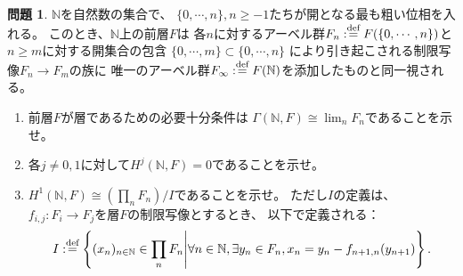 \documentclass[uplatex,dvipdfmx]{jsarticle}
\theoremstyle{definition}
\newtheorem{prob}[prob]{問題}
\newcommand\N{\mathbb{N}}
\def\dfn{:\overset{\mbox{{\scriptsize def}}}{=}}
\begin{document}
\begin{prob}\label{2.1}
  \(\N\)を自然数の集合で、
  \(\{0,\cdots, n\}, n\geq -1\)たちが開となる最も粗い位相を入れる。
  このとき、\(\N\)上の前層\(F\)は
  各\(n\)に対するアーベル群\(F_n\dfn F(\{0,\cdots,n\})\)と
  \(n\geq m\)に対する開集合の包含
  \(\{0,\cdots, m\} \subset \{0,\cdots ,n\}\)
  により引き起こされる制限写像\(F_n\to F_m\)の族に
  唯一のアーベル群\(F_{\infty}\dfn F(\N)\)を添加したものと同一視される。
  \begin{enumerate}[start=0]
    \item \label{2.1.0}
    前層\(F\)が層であるための必要十分条件は
    \(\Gamma(\N,F) \cong \lim_n F_n\)であることを示せ。
    \item \label{2.1.1}
    各\(j\neq 0,1\)に対して\(H^j(\N,F) = 0\)であることを示せ。
    \item \label{2.1.2}
    \(H^1(\N,F) \cong (\prod_n F_n)/I\)であることを示せ。
    ただし\(I\)の定義は、
    \(f_{i,j}:F_i\to F_j\)を層\(F\)の制限写像とするとき、
    以下で定義される：
    \[
    I\dfn \left\{ (x_n)_{n\in \N}\in \prod_n F_n \middle|
    \forall n\in \N, \exists y_n\in F_n, x_n = y_n - f_{n+1,n}(y_{n+1})\right\}.
    \]
  \end{enumerate}
\end{prob}
\end{document}
